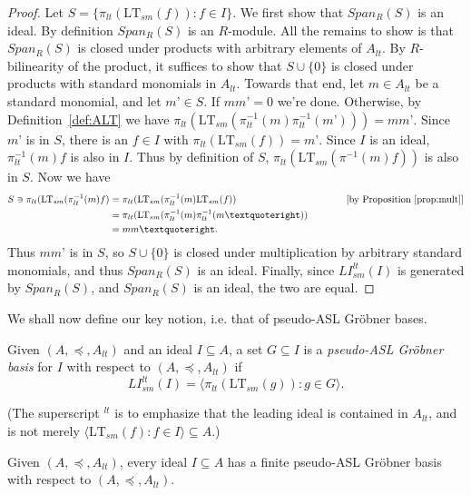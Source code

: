 \documentclass[11pt,reqno]{amsart}
\newcommand{\suchthat}{:}
\newcommand*{\eqcomment}[2][\qquad]{#1 &&\text{[#2]}}
\newcommand{\gb}{Gr\"{o}bner }
\newcommand{\ltsm}{\text{LT}_{sm}}
\newcommand{\lismlt}{LI_{sm}^{lt}}
\theoremstyle{definition}
\numberwithin{equation}{section}
\begin{document}
\begin{proof}
Let $S = \{\pi_{lt}(\ltsm(f)) \suchthat f \in I\}$. We first show that $Span_R(S)$ is an ideal. By definition $Span_R(S)$ is an $R$-module. All the remains to show is that $Span_R(S)$ is closed under products with arbitrary elements of $A_{lt}$. By $R$-bilinearity of the product, it suffices to show that $S \cup \{0\}$ is closed under products with standard monomials in $A_{lt}$. Towards that end, let $m \in A_{lt}$ be a standard monomial, and let $m’ \in S$. If $mm’ = 0$ we’re done. Otherwise, by Definition~\ref{def:ALT} we have $\pi_{lt}(\ltsm(\pi_{lt}^{-1}(m) \pi_{lt}^{-1}(m’))) = mm’$. Since $m’$ is in $S$, there is an $f \in I$ with $\pi_{lt}(\ltsm(f)) = m’$. Since $I$ is an ideal, $\pi_{lt}^{-1}(m) f$ is also in $I$. Thus by definition of $S$, $\pi_{lt}(\ltsm(\pi^{-1}(m)f))$ is also in $S$. Now we have
\begin{align}
S \ni \pi_{lt}(\ltsm(\pi_{lt}^{-1}(m) f) & = \pi_{lt}(\ltsm(\pi_{lt}^{-1}(m) \ltsm(f)) & \eqcomment{by Proposition~\ref{prop:mult}} \\ %
 & = \pi_{lt}(\ltsm(\pi_{lt}^{-1}(m) \pi_{lt}^{-1}(m’)) \\
 & = mm’. %
\end{align}
Thus $mm’$ is in $S$, so $S \cup \{0\}$ is closed under multiplication by arbitrary standard monomials, and thus $Span_R(S)$ is an ideal.
Finally, since $\lismlt(I)$ is generated by $Span_R(S)$, and $Span_R(S)$ is an ideal, the two are equal.
\end{proof}

We shall now define our key notion, i.e. that of pseudo-ASL \gb bases.

\begin{definition}[store=defaslgb,note={Pseudo-ASL \gb basis}]
\label{def:asl-gb}
Given $(A, \preceq, A_{lt})$ and an ideal $I \subseteq A$, a set $G \subseteq I$ is a \emph{pseudo-ASL Gröbner basis} for $I$ with respect to $(A,\preceq,A_{lt})$ if 
\[
\lismlt(I) = \langle \pi_{lt}(\ltsm(g)) \suchthat g \in G \rangle.
\]
\end{definition}

(The superscript $^{lt}$ is to emphasize that the leading ideal is contained in $A_{lt}$, and is not merely $\langle \ltsm(f) : f \in I \rangle \subseteq A$.)

\begin{theorem}[store=thmaslgbexistence, note=Existence of pseudo-ASL Gröbner bases] \label{thm:asl-gb-existence}
Given $(A, \preceq, A_{lt})$, every ideal $I \subseteq A$ has a finite pseudo-ASL \gb basis with respect to $(A, \preceq, A_{lt})$.
\end{theorem}
\end{document}
